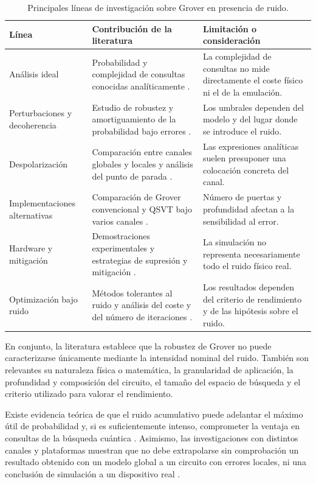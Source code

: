 \documentclass[11pt,a4paper]{article}
\begin{document}
\begin{table}[htbp]
\centering
\small
\renewcommand{\arraystretch}{1.18}
\begin{tabular}{@{}p{2.6cm}p{5.2cm}p{5.2cm}@{}}
\toprule
\textbf{Línea} & \textbf{Contribución de la literatura} & \textbf{Limitación o consideración} \\
\midrule
Análisis ideal & Probabilidad y complejidad de consultas conocidas analíticamente \cite{grover1996,boyer1998}. & La complejidad de consultas no mide directamente el coste físico ni el de la emulación. \\
\addlinespace
Perturbaciones y decoherencia & Estudio de robustez y amortiguamiento de la probabilidad bajo errores \cite{pablonorman1999,salas2008}. & Los umbrales dependen del modelo y del lugar donde se introduce el ruido. \\
\addlinespace
Despolarización & Comparación entre canales globales y locales y análisis del punto de parada \cite{cohn2016}. & Las expresiones analíticas suelen presuponer una colocación concreta del canal. \\
\addlinespace
Implementaciones alternativas & Comparación de Grover convencional y QSVT bajo varios canales \cite{ijaz2023}. & Número de puertas y profundidad afectan a la sensibilidad al error. \\
\addlinespace
Hardware y mitigación & Demostraciones experimentales y estrategias de supresión y mitigación \cite{pokharel2024,abughanem2025}. & La simulación no representa necesariamente todo el ruido físico real. \\
\addlinespace
Optimización bajo ruido & Métodos tolerantes al ruido y análisis del coste y del número de iteraciones \cite{leng2025,khan2026}. & Los resultados dependen del criterio de rendimiento y de las hipótesis sobre el ruido. \\
\bottomrule
\end{tabular}
\caption{Principales líneas de investigación sobre Grover en presencia de ruido.}
\label{tab:resumen_literatura}
\end{table}

En conjunto, la literatura establece que la robustez de Grover no puede caracterizarse únicamente mediante la intensidad nominal del ruido. También son relevantes su naturaleza física o matemática, la granularidad de aplicación, la profundidad y composición del circuito, el tamaño del espacio de búsqueda y el criterio utilizado para valorar el rendimiento.

Existe evidencia teórica de que el ruido acumulativo puede adelantar el máximo útil de probabilidad y, si es suficientemente intenso, comprometer la ventaja en consultas de la búsqueda cuántica \cite{cohn2016,khan2026}. Asimismo, las investigaciones con distintos canales y plataformas muestran que no debe extrapolarse sin comprobación un resultado obtenido con un modelo global a un circuito con errores locales, ni una conclusión de simulación a un dispositivo real \cite{ijaz2023,abughanem2025}.
\end{document}
